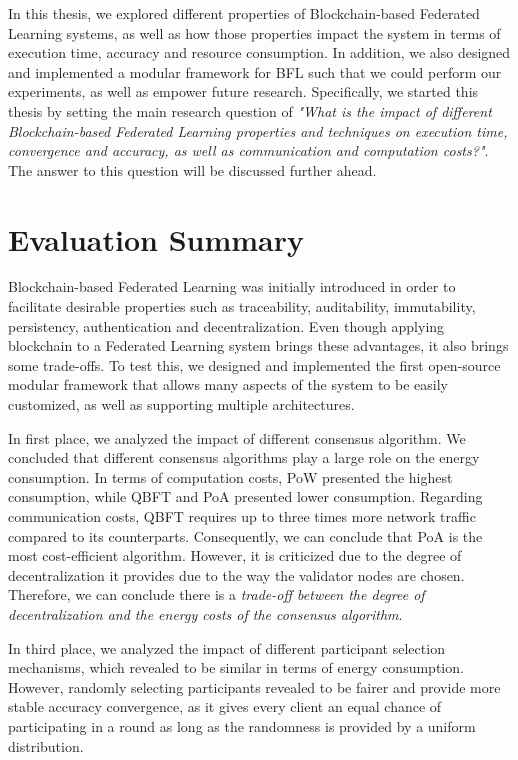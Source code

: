 In this thesis, we explored different properties of Blockchain-based Federated Learning systems, as well as how those properties impact the system in terms of execution time, accuracy and resource consumption. In addition, we also designed and implemented a modular framework for BFL such that we could perform our experiments, as well as empower future research. Specifically, we started this thesis by setting the main research question of \textit{"What is the impact of different Blockchain-based Federated Learning properties and techniques on execution time, convergence and accuracy, as well as communication and computation costs?"}. The answer to this question will be discussed further ahead.

\section{Evaluation Summary}\label{conclusions:evaluation}

Blockchain-based Federated Learning was initially introduced in order to facilitate desirable properties such as traceability, auditability, immutability, persistency, authentication and decentralization. Even though applying blockchain to a Federated Learning system brings these advantages, it also brings some trade-offs. To test this, we designed and implemented the first open-source modular framework that allows many aspects of the system to be easily customized, as well as supporting multiple architectures.

In first place, we analyzed the impact of different consensus algorithm. We concluded that different consensus algorithms play a large role on the energy consumption. In terms of computation costs, PoW presented the highest consumption, while QBFT and PoA presented lower consumption. Regarding communication costs, QBFT requires up to three times more network traffic compared to its counterparts. Consequently, we can conclude that PoA is the most cost-efficient algorithm. However, it is criticized due to the degree of decentralization it provides due to the way the validator nodes are chosen. Therefore, we can conclude there is a \textit{trade-off between the degree of decentralization and the energy costs of the consensus algorithm}.

In third place, we analyzed the impact of different participant selection mechanisms, which revealed to be similar in terms of energy consumption. However, randomly selecting participants revealed to be fairer and provide more stable accuracy convergence, as it gives every client an equal chance of participating in a round as long as the randomness is provided by a uniform distribution.

